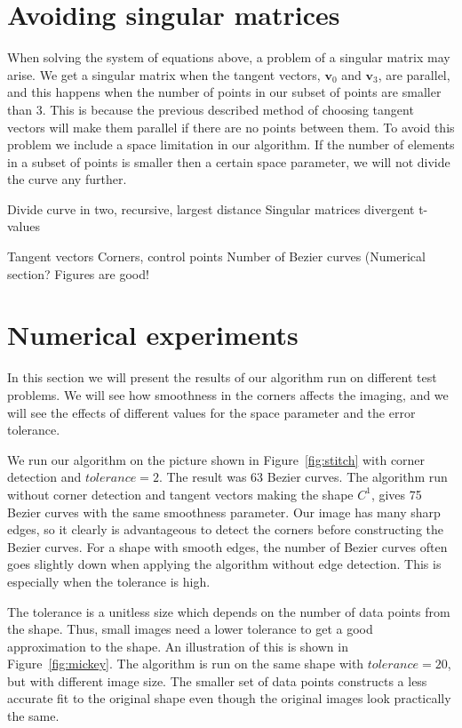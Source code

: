 \documentclass[10pt]{article}
\begin{document}
\section*{Avoiding singular matrices}
When solving the system of equations above, a problem of a singular matrix may arise. We get a singular matrix when the tangent vectors, $\mathbf{v}_0$ and $\mathbf{v}_3$, are parallel, and this happens when the number of points in our subset of points are smaller than 3. This is because the previous described method of choosing tangent vectors will make them parallel if there are no points between them. To avoid this problem we include a space limitation in our algorithm. If the number of elements in a subset of points is smaller then a certain space parameter, we will not divide the curve any further.


Divide curve in two, recursive, largest distance
Singular matrices
divergent t-values


Tangent vectors
Corners, control points
Number of Bezier curves (Numerical section?
Figures are good!


\section{Numerical experiments}

In this section we will present the results of our algorithm run on different test problems. We will see how smoothness in the corners affects the imaging, and we will see the effects of different values for the space parameter and the error tolerance.


We run our algorithm on the picture shown in Figure~\ref{fig:stitch} with corner detection and $tolerance = 2$. The result was 63 Bezier curves. The algorithm run without corner detection and tangent vectors making the shape $C^1$, gives 75 Bezier curves with the same smoothness parameter. Our image has many sharp edges, so it clearly is advantageous to detect the corners before constructing the Bezier curves. For a shape with smooth edges, the number of Bezier curves often goes slightly down when applying the algorithm without edge detection. This is especially when the tolerance is high.  

The tolerance is a unitless size which depends on the number of data points from the shape. Thus, small images need a lower tolerance to get a good approximation to the shape.  An illustration of this is shown in Figure~\ref{fig:mickey}. The algorithm is run on the same shape with $tolerance = 20$, but with different image size. The smaller set of data points constructs a less accurate fit to the original shape even though the original images look practically the same. 
\end{document}
